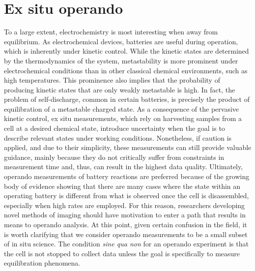 \documentclass[journal=cmatex,manuscript=perspective]{achemso}
\begin{document}
\section{Ex situ  operando}

To a large extent, electrochemistry is most interesting when away from
equilibrium. As electrochemical devices, batteries are useful during
operation, which is inherently under kinetic control. While the
kinetic states are determined by the thermodynamics of the system,
metastability is more prominent under electrochemical conditions than
in other classical chemical environments, such as high
temperatures. This prominence also implies that the probability of
producing kinetic states that are only weakly metastable is high. In
fact, the problem of self-discharge, common in certain batteries, is
precisely the product of equilibration of a metastable charged
state. As a consequence of the pervasive kinetic control, ex situ
measurements, which rely on harvesting samples from a cell at a
desired chemical state, introduce uncertainty when the goal is to
describe relevant states under working conditions. Nonetheless, if
caution is applied, and due to their simplicity, these measurements
can still provide valuable guidance\cite{yu2015-2}, mainly because
they do not critically suffer from constraints in measurement time
and, thus, can result in the highest data quality. Ultimately,
operando measurements of battery reactions are preferred because of
the growing body of evidence showing that there are many cases where
the state within an operating battery is different from what is
observed once the cell is disassembled\cite{liu2014, lim2016},
especially when high rates are employed. For this reason, researchers
developing novel methods of imaging should have motivation to enter a
path that results in means to operando analysis. At this point, given
certain confusion in the field, it is worth clarifying that we
consider operando measurements to be a small subset of in situ
science. The condition \emph{sine qua non} for an operando experiment
is that the cell is not stopped to collect data unless the goal is
specifically to measure equilibration phenomena.
\end{document}
